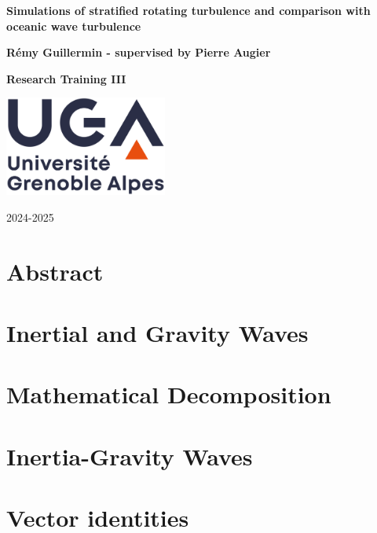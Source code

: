 \documentclass[11pt]{report}
\begin{document}
\pagestyle{fancy}
\fancyhf{}
\fancyhead[LE]{\nouppercase{\rightmark\hfill\leftmark}}
\fancyhead[RO]{\nouppercase{\leftmark\hfill\rightmark}}
\fancyfoot[C]{\thepage}

\begin{titlepage}
   \begin{center}
       \vspace*{1cm}
		
		\Huge
       \textbf{Simulations of stratified rotating turbulence and comparison with oceanic wave turbulence}
            
       \vspace{1.5cm}
       
       \LARGE
       \textbf{Rémy Guillermin - supervised by Pierre Augier}
       
       \vfill
       
       \Large
       \textbf{Research Training III}
            
       \vspace{0.8cm}
     
       \includegraphics[width=0.4\textwidth]{UGA-logo}
		
		\vspace{0.8cm}
		
       2024-2025
            
   \end{center}
\end{titlepage}

\chapter*{Abstract}

\tableofcontents

\newpage
\chapter{Inertial and Gravity Waves}


\chapter{Mathematical Decomposition}


\chapter{Inertia-Gravity Waves}




\appendix
\chapter{Vector identities}


\printbibliography
\end{document}
